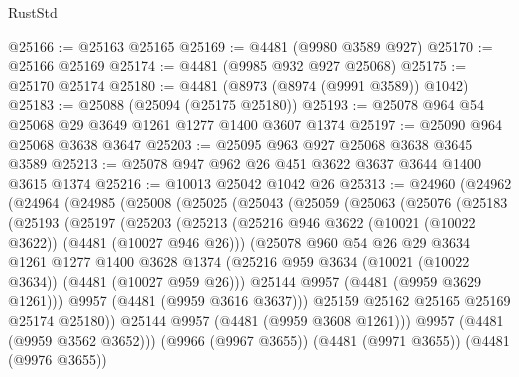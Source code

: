 \begin{lexlean}{RustStd}
\begin{coremodule}
@25166 := @25163 @25165
@25169 := @4481 (@9980 @3589 @927)
@25170 := @25166 @25169
@25174 := @4481 (@9985 @932 @927 @25068)
@25175 := @25170 @25174
@25180 := @4481 (@8973 (@8974 (@9991 @3589)) @1042)
@25183 := @25088 (@25094 (@25175 @25180))
@25193 := @25078 @964 @54 @25068 @29 @3649 @1261 @1277 @1400 @3607 @1374
@25197 := @25090 @964 @25068 @3638 @3647
@25203 := @25095 @963 @927 @25068 @3638 @3645 @3589
@25213 := @25078 @947 @962 @26 @451 @3622 @3637 @3644 @1400 @3615 @1374
@25216 := @10013 @25042 @1042 @26
@25313 := @24960
    (@24962
      (@24964
        (@24985
          (@25008
            (@25025
              (@25043
                (@25059
                  (@25063
                    (@25076
                      (@25183
                        (@25193
                          (@25197
                            (@25203
                              (@25213
                                (@25216
                                  @946
                                  @3622
                                  (@10021 (@10022 @3622))
                                  (@4481 (@10027 @946 @26)))
                                (@25078
                                  @960
                                  @54
                                  @26
                                  @29
                                  @3634
                                  @1261
                                  @1277
                                  @1400
                                  @3628
                                  @1374
                                  (@25216
                                    @959
                                    @3634
                                    (@10021 (@10022 @3634))
                                    (@4481 (@10027 @959 @26)))
                                  @25144
                                  @9957
                                  (@4481 (@9959 @3629 @1261)))
                                @9957
                                (@4481 (@9959 @3616 @3637)))
                              @25159
                              @25162
                              @25165
                              @25169
                              @25174
                              @25180))
                          @25144
                          @9957
                          (@4481 (@9959 @3608 @1261)))
                        @9957
                        (@4481 (@9959 @3562 @3652)))
                      (@9966 (@9967 @3655))
                      (@4481 (@9971 @3655))
                      (@4481 (@9976 @3655))

\end{coremodule}
\end{lexlean}
